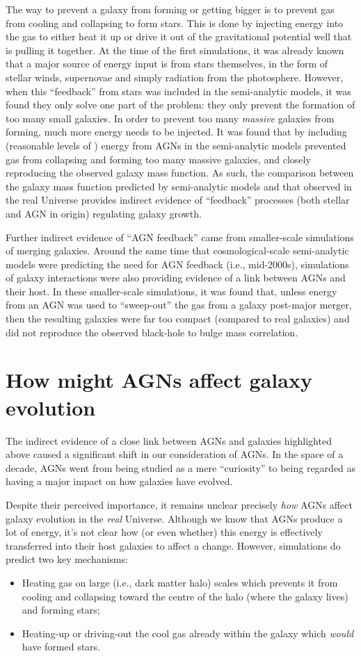 \documentclass[11pt]{article}
\begin{document}
The way to prevent a galaxy from forming or getting bigger is to
prevent gas from cooling and collapsing to form stars. This is done by
injecting energy into the gas to either heat it up or drive it out of
the gravitational potential well that is pulling it together. At the
time of the first simulations, it was already known that a major
source of energy input is from stars themselves, in the form of stellar
winds, supernovae and simply radiation from the photosphere. However,
when this ``feedback'' from stars was included in the semi-analytic
models, it was found they only solve one part of the problem: they
only prevent the formation of too many small galaxies. In order to
prevent too many {\it massive} galaxies from forming, much more energy
needs to be injected. It was found that by including (reasonable
levels of ) energy from AGNs in the semi-analytic models prevented gas
from collapsing and forming too many massive galaxies, and closely
reproducing the observed galaxy mass function. As such, the comparison
between the galaxy mass function predicted by semi-analytic models and
that observed in the real Universe provides indirect evidence of
``feedback'' processes (both stellar and AGN in origin) regulating
galaxy growth.

Further indirect evidence of ``AGN feedback'' came from smaller-scale
simulations of merging galaxies. Around the same time that
cosmological-scale semi-analytic models were predicting the need for
AGN feedback (i.e., mid-2000s), simulations of galaxy interactions
were also providing evidence of a link between AGNs and their host. In
these smaller-scale simulations, it was found that, unless energy from
an AGN was used to ``sweep-out'' the gas from a galaxy post-major
merger, then the resulting galaxies were far too compact (compared to
real galaxies) and did not reproduce the observed black-hole to bulge
mass correlation.

\section{How might AGNs affect galaxy evolution}
The indirect evidence of a close link between AGNs and galaxies
highlighted above caused a significant shift in our consideration of
AGNs. In the space of a decade, AGNs went from being studied as a
mere ``curiosity'' to being regarded as having a major impact on how
galaxies have evolved.

Despite their perceived importance, it remains unclear precisely {\it
  how} AGNs affect galaxy evolution in the {\it real}
Universe. Although we know that AGNs produce a lot of energy, it's not
clear how (or even whether) this energy is effectively transferred
into their host galaxies to affect a change. However, simulations do
predict two key mechanisms:
\begin{itemize}
\item Heating gas on large (i.e., dark matter halo) scales which
  prevents it from cooling and collapsing toward the centre of the
  halo (where the galaxy lives) and forming stars;
\item Heating-up or driving-out the cool gas already within the galaxy which
  {\it would} have formed stars.
\end{itemize} 
\end{document}
